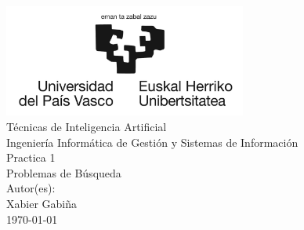 \documentclass{report}
\begin{document}
    \begin{titlepage}
        \centering
        \includegraphics[width=0.6\textwidth]{./.img/logo.jpg}\\
        \vspace{1cm}
        \LARGE Técnicas de Inteligencia Artificial\\
        \vspace{0.5cm}
        \Large Ingeniería Informática de Gestión y Sistemas de Información\\
        \vspace{3cm}
        \Huge Practica 1\\
        \huge Problemas de Búsqueda\\
        \vspace{2.5cm}
        \Large Autor(es):\\
        \vspace{0.2cm}
        \large Xabier Gabiña\\
        \vfill
        \today
    \end{titlepage}
    \tableofcontents
\end{document}
